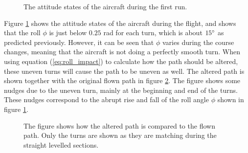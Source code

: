 \begin{figure}[]
    \centering
    \caption{The attitude states of the aircraft during the first run.}
	\label{fig:first_run_states}
\end{figure}

Figure \ref{fig:first_run_states} shows the attitude states of the aircraft during the flight, and shows that the roll $\phi$ is just below $0.25$ rad for each turn, which is about $15 \degree$ as predicted previously. However, it can be seen that $\phi$ varies during the course changes, meaning that the aircraft is not doing a perfectly smooth turn. When using equation (\ref{eq:roll_impact}) to calculate how the path should be altered, these uneven turns will cause the path to be uneven as well. The altered path is shown together with the original flown path in figure \ref{fig:altered_vs_flown}. The figure shows some nudges due to the uneven turn, mainly at the beginning and end of the turns. These nudges correspond to the abrupt rise and fall of the roll angle $\phi$ shown in figure \ref{fig:first_run_states}.

\begin{figure}[]
    \centering
    \caption{The figure shows how the altered path is compared to the flown path. Only the turns are shown as they are matching during the straight levelled sections.}
	\label{fig:altered_vs_flown}
\end{figure}

